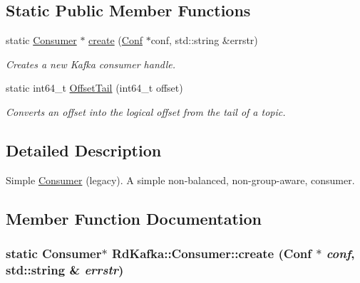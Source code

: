 \subsection*{Static Public Member Functions}
\begin{DoxyCompactItemize}
\item 
static \hyperlink{classRdKafka_1_1Consumer}{Consumer} $\ast$ \hyperlink{classRdKafka_1_1Consumer_aaa4fdf4ec84bbe40561f7b3d5676c065}{create} (\hyperlink{classRdKafka_1_1Conf}{Conf} $\ast$conf, std::string \&errstr)
\begin{DoxyCompactList}\small\item\em Creates a new Kafka consumer handle. \item\end{DoxyCompactList}\item 
static int64\_\-t \hyperlink{classRdKafka_1_1Consumer_a7ad238e24f96a58540f96714e1e292b0}{OffsetTail} (int64\_\-t offset)
\begin{DoxyCompactList}\small\item\em Converts an offset into the logical offset from the tail of a topic. \item\end{DoxyCompactList}\end{DoxyCompactItemize}


\subsection{Detailed Description}
Simple \hyperlink{classRdKafka_1_1Consumer}{Consumer} (legacy). A simple non-\/balanced, non-\/group-\/aware, consumer. 

\subsection{Member Function Documentation}
\hypertarget{classRdKafka_1_1Consumer_aaa4fdf4ec84bbe40561f7b3d5676c065}{
\subsubsection[{create}]{\setlength{\rightskip}{0pt plus 5cm}static {\bf Consumer}$\ast$ RdKafka::Consumer::create ({\bf Conf} $\ast$ {\em conf}, \/  std::string \& {\em errstr})}}
\label{classRdKafka_1_1Consumer_aaa4fdf4ec84bbe40561f7b3d5676c065}


